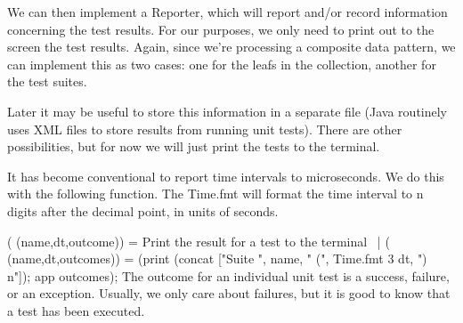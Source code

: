 We can then implement a Reporter, which will report and/or record
information concerning the test results. For our purposes, we only need
to print out to the screen the test results. Again, since we're
processing a composite data pattern, we can implement this as two cases:
one for the leafs in the collection, another for the test suites.

Later it may be useful to store this information in a separate file
(Java routinely uses XML files to store results from running unit
tests).
There are other possibilities, but for now we will just print the tests
to the terminal.

It has become conventional to report time intervals to microseconds. We
do this with the following function. The {\Tt{}Time.fmt\nwendquote} will format the
time interval to {\Tt{}n\nwendquote} digits after the decimal point, in units of seconds.

\nwenddocs{}\endmoddef\nwstartdeflinemarkup{}\nwenddeflinemarkup
{}
  ( (name,dt,outcome)) =
    \LA{}Print the result for a test  to the terminal~{\nwtagstyle{}}\RA{}
  |  ( (name,dt,outcomes)) =
    (print (concat ["Suite ", name, " (", Time.fmt 3 dt, ")\\n"]);
     app  outcomes);
\eatline
{}\nwendcode{}\nwdocspar
The outcome for an individual unit test is a success, failure, or an exception.
Usually, we only care about failures, but it is good to know that a test
has been executed.

